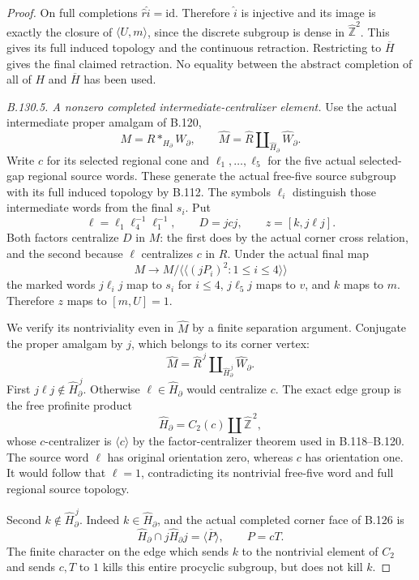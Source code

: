 \begin{proof}
On full completions $\widehat r\widehat i=\mathrm{id}$.
Therefore $\widehat i$ is injective and its image is exactly
the closure of $\langle U,m\rangle$, since the discrete subgroup
is dense in $\widehat{\mathbb Z}^2$. This gives its full
induced topology and the continuous retraction. Restricting to
$\overline H$ gives the final claimed retraction. No equality
between the abstract completion of all of $H$ and
$\overline H$ has been used.

\emph{B.130.5. A nonzero completed intermediate-centralizer element.}
Use the actual intermediate proper amalgam of B.120,
\[
 M=R*_{H_\partial}W_\partial,\qquad
 \widehat M=\widehat R
       \amalg_{\widehat H_\partial}\widehat W_\partial.
\]
Write \(c\) for its selected regional cone and
\(\ell_1,\ldots,\ell_5\) for the five actual selected-gap
regional source words. These generate the actual free-five
source subgroup with its full induced topology by B.112.
The symbols \(\ell_i\) distinguish those intermediate words
from the final \(s_i\). Put
\[
 \ell=\ell_1\ell_4^{-1}\ell_1^{-1},\qquad
 D=jcj,\qquad z=[k,j\ell j].
\]
Both factors centralize \(D\) in \(M\): the first does by the
actual corner cross relation, and the second because
\(\ell\) centralizes \(c\) in \(R\). Under the actual final map
\[
 M\longrightarrow
 M/\langle\!\langle(jP_i)^2:1\leq i\leq4\rangle\!\rangle
\]
the marked words \(j\ell_i j\) map to \(s_i\) for \(i\leq4\),
\(j\ell_5j\) maps to \(v\), and \(k\) maps to \(m\).
Therefore \(z\) maps to \([m,U]=1\).

We verify its nontriviality even in \(\widehat M\) by a finite
separation argument. Conjugate the proper amalgam by \(j\),
which belongs to its corner vertex:
\[
 \widehat M=\widehat R^{\,j}
       \amalg_{\widehat H_\partial^{\,j}}\widehat W_\partial .
\]
First \(j\ell j\notin\widehat H_\partial^{\,j}\).
Otherwise \(\ell\in\widehat H_\partial\) would centralize \(c\).
The exact edge group is the free profinite product
\[
 \widehat H_\partial=C_2(c)\amalg\widehat{\mathbb Z}^{\,2},
\]
whose \(c\)-centralizer is \(\langle c\rangle\) by the
factor-centralizer theorem used in B.118--B.120.
The source word \(\ell\) has original orientation zero, whereas
\(c\) has orientation one. It would follow that \(\ell=1\),
contradicting its nontrivial free-five word and full regional
source topology.

Second \(k\notin\widehat H_\partial^{\,j}\). Indeed
\(k\in\widehat H_\partial\), and the actual completed corner
face of B.126 is
\[
 \widehat H_\partial\cap j\widehat H_\partial j
       =\overline{\langle P\rangle},\qquad P=cT.
\]
The finite character on the edge which sends \(k\) to the
nontrivial element of \(C_2\) and sends \(c,T\) to \(1\)
kills this entire procyclic subgroup, but does not kill \(k\).


\end{proof}
